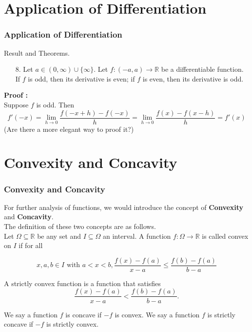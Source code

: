 \documentclass[12pt, t]{beamer}
\begin{document}
\section{Application of Differentiation}
\begin{frame}
    \frametitle{Application of Differentiation}
    Result and Theorems.\\
    \begin{enumerate}
        \item[8.] Let $a\in(0,\infty)\cup\{\infty\}$. Let $f:(-a,a)\rightarrow\mathbb{R}$ be a differentiable function.
            If $f$ is odd, then its derivative is even; if $f$ is even, then its derivative is odd.
    \end{enumerate}

    \textbf{Proof :}\\
    \hspace{1em} Suppose $f$ is odd. Then
    \begin{equation*}
        f'(-x)=\underset{h\rightarrow 0}{\lim}\frac{f(-x+h)-f(-x)}{h}=\underset{h\rightarrow 0}{\lim}\frac{f(x)-f(x-h)}{h}=f'(x)
    \end{equation*}
    (Are there a more elegant way to proof it?)
\end{frame}


\section{Convexity and Concavity}
\begin{frame}
    \frametitle{Convexity and Concavity}

    For further analysis of functions, we would introduce the concept of \textbf{Convexity} and \textbf{Concavity}. \\
    The definition of these two concepts are as follows.\\

    \hspace{1em}
    Let $\Omega\subseteq\mathbb{R}$ be any set and $I\subseteq\Omega$ an interval. A function $f:\Omega\rightarrow\mathbb{R}$
    is called convex on $I$ if for all

    \begin{equation*}
        x, a, b\in I \text{ with } a<x<b, \frac{f(x)-f(a)}{x-a}\leq\frac{f(b)-f(a)}{b-a}
    \end{equation*}

    \vspace{0.5em}
    \hspace{1em}
    A strictly convex function is a function that satisfies
    \begin{equation}
        \frac{f(x)-f(a)}{x-a}<\frac{f(b)-f(a)}{b-a}.
    \end{equation}

    \hspace{1em}
    We say a function $f$ is concave if $-f$ is convex. We say a function $f$ is strictly concave if $-f$ is strictly convex.
\end{frame}
\end{document}
